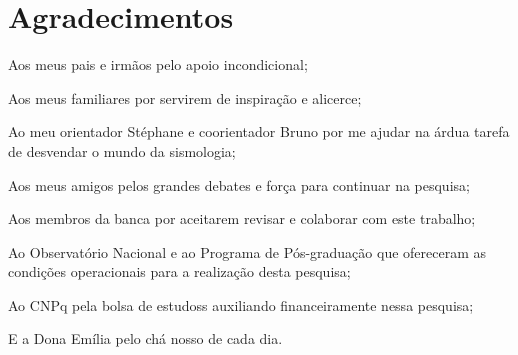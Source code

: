\chapter*{Agradecimentos}	

Aos meus pais e irmãos pelo apoio incondicional;

Aos meus familiares por servirem de inspiração e alicerce;

Ao meu orientador Stéphane e coorientador Bruno por me ajudar na árdua tarefa de desvendar o mundo da sismologia;

Aos meus amigos pelos grandes debates e força para continuar na pesquisa;

Aos membros da banca por aceitarem revisar e colaborar com este trabalho;

Ao Observatório Nacional e ao Programa de Pós-graduação que ofereceram as condições operacionais para a realização desta pesquisa;

Ao CNPq pela bolsa de estudoss auxiliando financeiramente nessa pesquisa;

E a Dona Emília pelo chá nosso de cada dia. 